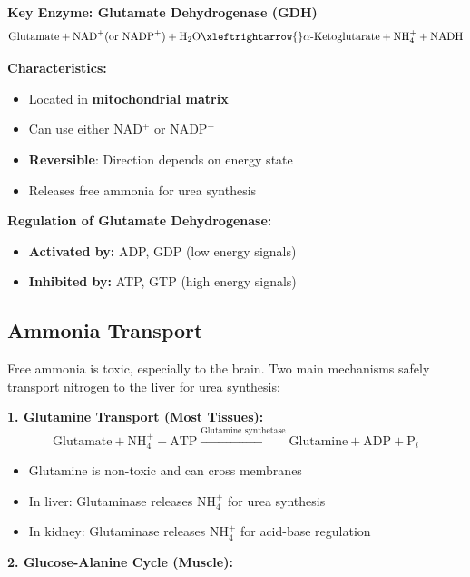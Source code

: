 \textbf{Key Enzyme: Glutamate Dehydrogenase (GDH)}
\[
\text{Glutamate} + \text{NAD}^+ (\text{or NADP}^+) + \text{H}_2\text{O} \xleftrightarrow{} \alpha\text{-Ketoglutarate} + \text{NH}_4^+ + \text{NADH}
\]

\textbf{Characteristics:}
\begin{itemize}
    \item Located in \textbf{mitochondrial matrix}
    \item Can use either NAD$^+$ or NADP$^+$
    \item \textbf{Reversible}: Direction depends on energy state
    \item Releases free ammonia for urea synthesis
\end{itemize}

\textbf{Regulation of Glutamate Dehydrogenase:}
\begin{itemize}
    \item \textbf{Activated by:} ADP, GDP (low energy signals)
    \item \textbf{Inhibited by:} ATP, GTP (high energy signals)
\end{itemize}

\subsection{Ammonia Transport}

Free ammonia is toxic, especially to the brain. Two main mechanisms safely transport nitrogen to the liver for urea synthesis:

\textbf{1. Glutamine Transport (Most Tissues):}
\[
\text{Glutamate} + \text{NH}_4^+ + \text{ATP} \xrightarrow{\text{Glutamine synthetase}} \text{Glutamine} + \text{ADP} + \text{P}_i
\]
\begin{itemize}
    \item Glutamine is non-toxic and can cross membranes
    \item In liver: Glutaminase releases NH$_4^+$ for urea synthesis
    \item In kidney: Glutaminase releases NH$_4^+$ for acid-base regulation
\end{itemize}

\textbf{2. Glucose-Alanine Cycle (Muscle):}


